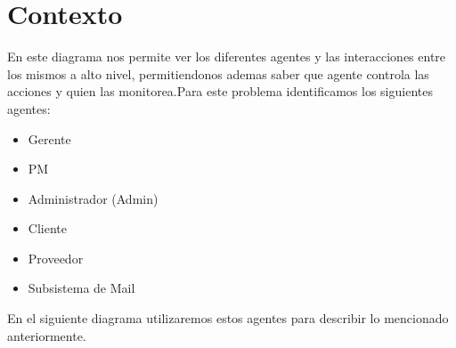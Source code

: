 \section{Contexto}
En este diagrama nos permite ver los diferentes agentes y las interacciones entre los mismos a alto nivel, permitiendonos ademas saber que agente controla las acciones y quien las monitorea.Para este problema identificamos los siguientes agentes:

\begin{itemize}
\item Gerente
\item PM 
\item Administrador (Admin) 
\item Cliente 
\item Proveedor
\item Subsistema de Mail 
\end{itemize}

En el siguiente diagrama utilizaremos estos agentes para describir lo mencionado anteriormente.

